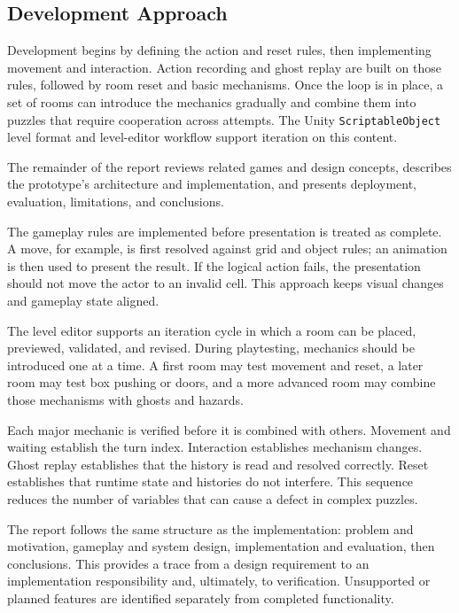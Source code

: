 \subsection{Development Approach}

Development begins by defining the action and reset rules, then implementing movement and interaction. Action recording and ghost replay are built on those rules, followed by room reset and basic mechanisms. Once the loop is in place, a set of rooms can introduce the mechanics gradually and combine them into puzzles that require cooperation across attempts. The Unity \texttt{ScriptableObject} level format and level-editor workflow support iteration on this content.

The remainder of the report reviews related games and design concepts, describes the prototype's architecture and implementation, and presents deployment, evaluation, limitations, and conclusions.


The gameplay rules are implemented before presentation is treated as complete. A move, for example, is first resolved against grid and object rules; an animation is then used to present the result. If the logical action fails, the presentation should not move the actor to an invalid cell. This approach keeps visual changes and gameplay state aligned.


The level editor supports an iteration cycle in which a room can be placed, previewed, validated, and revised. During playtesting, mechanics should be introduced one at a time. A first room may test movement and reset, a later room may test box pushing or doors, and a more advanced room may combine those mechanisms with ghosts and hazards.


Each major mechanic is verified before it is combined with others. Movement and waiting establish the turn index. Interaction establishes mechanism changes. Ghost replay establishes that the history is read and resolved correctly. Reset establishes that runtime state and histories do not interfere. This sequence reduces the number of variables that can cause a defect in complex puzzles.


The report follows the same structure as the implementation: problem and motivation, gameplay and system design, implementation and evaluation, then conclusions. This provides a trace from a design requirement to an implementation responsibility and, ultimately, to verification. Unsupported or planned features are identified separately from completed functionality.

